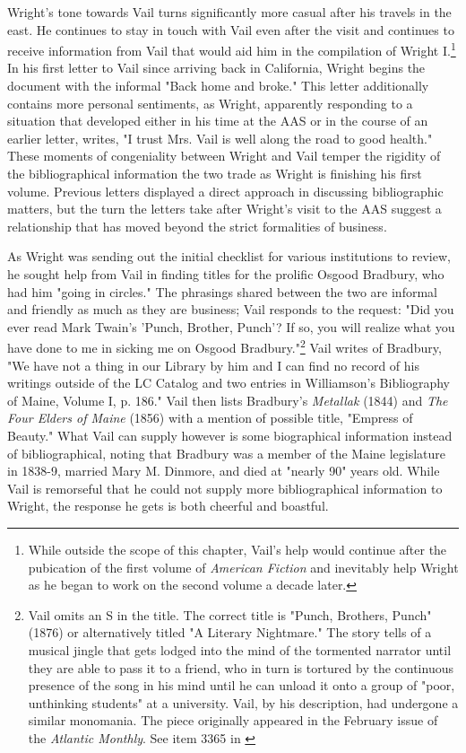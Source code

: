 Wright's tone towards Vail turns significantly more casual after his travels in the east. He continues to stay in touch with Vail even after the visit and continues to receive information from Vail that would aid him in the compilation of Wright I.\footnote{While outside the scope of this chapter, Vail's help would continue after the pubication of the first volume of \textit{American Fiction} and inevitably help Wright as he began to work on the second volume a decade later.} In his first letter to Vail since arriving back in California, Wright begins the document with the informal "Back home and broke." This letter additionally contains more personal sentiments, as Wright, apparently responding to a situation that developed either in his time at the AAS or in the course of an earlier letter, writes, "I trust Mrs. Vail is well along the road to good health." These moments of congeniality between Wright and Vail temper the rigidity of the bibliographical information the two trade as Wright is finishing his first volume. Previous letters displayed a direct approach in discussing bibliographic matters, but the turn the letters take after Wright's visit to the AAS suggest a relationship that has moved beyond the strict formalities of business. 

As Wright was sending out the initial checklist for various institutions to review, he sought help from Vail in finding titles for the prolific Osgood Bradbury, who had him "going in circles."\autocite{lyle_h._wright_letter_1937-2} The phrasings shared between the two are informal and friendly as much as they are business; Vail responds to the request: "Did you ever read Mark Twain's 'Punch, Brother, Punch'? If so, you will realize what you have done to me in sicking me on Osgood Bradbury."\footnote{\autocite{robert_g._vail_letter_1937-1}Vail omits an S in the title. The correct title is "Punch, Brothers, Punch" (1876) or alternatively titled "A Literary Nightmare." The story tells of a musical jingle that gets lodged into the mind of the tormented narrator until they are able to pass it to a friend, who in turn is tortured by the continuous presence of the song in his mind until he can unload it onto a group of "poor, unthinking students" at a university. Vail, by his description, had undergone a similar monomania. The piece originally appeared in the February issue of the \textit{Atlantic Monthly}. See item 3365 in \autocite{blanck_bibliography_1955-1}} Vail writes of Bradbury, "We have not a thing in our Library by him and I can find no record of his writings outside of the LC Catalog and two entries in Williamson's Bibliography of Maine, Volume I, p. 186." Vail then lists Bradbury's \textit{Metallak} (1844) and \textit{The Four Elders of Maine} (1856) with a mention of possible title, "Empress of Beauty." What Vail can supply however is some biographical information instead of bibliographical, noting that Bradbury was a member of the Maine legislature in 1838-9, married Mary M. Dinmore, and died at "nearly 90" years old.\autocite{robert_g._vail_letter_1937-1} While Vail is remorseful that he could not supply more bibliographical information to Wright, the response he gets is both cheerful and boastful. 

